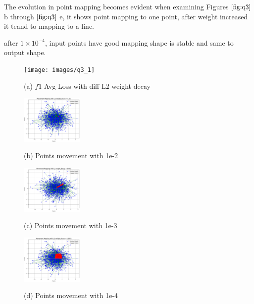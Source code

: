 \documentclass{article}
\begin{document}
The evolution in point mapping becomes evident when examining 
Figures $\ref{fig:q3}$ b through $\ref{fig:q3}$  e, it shows point mapping to one point,
after weight increased it teand to mapping to a line.

after $1\times 10^{-4}$, input points have good mapping shape is stable and same to output shape.


\begin{figure}[htb]

  \begin{minipage}[b]{1.0\linewidth}
    \centering
    \centerline{\texttt{[image: images/q3\_1]}}
   \centerline{(a) $f1$ Avg Loss with diff L2 weight decay }\medskip
  \end{minipage}
  \begin{minipage}[b]{.48\linewidth}
    \centering
    \centerline{\includegraphics[width=3.0cm]{images/q3_1e-2}}
    \centerline{(b) Points movement with 1e-2}\medskip
  \end{minipage}
  \hfill
  \begin{minipage}[b]{0.48\linewidth}
    \centering
    \centerline{\includegraphics[width=3.0cm]{images/q3_1e-3}}
    \centerline{(c) Points movement with 1e-3}\medskip
  \end{minipage}
  \begin{minipage}[b]{.48\linewidth}
    \centering
    \centerline{\includegraphics[width=3.0cm]{images/q3_1e-4}}
    \centerline{(d) Points movement with 1e-4}\medskip
  \end{minipage}

\end{figure}
\end{document}
